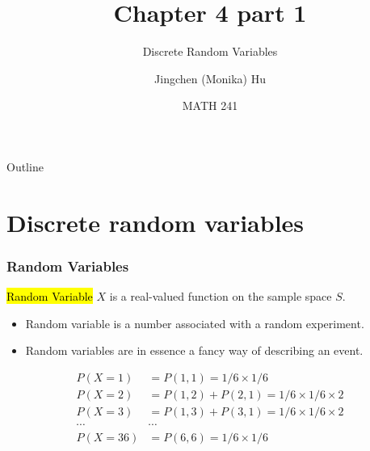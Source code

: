 \documentclass[slidestop,compress,mathserif]{beamer}
\title[Chapter 4 part 1]{Chapter 4 part 1}
\subtitle{Discrete Random Variables}
\author[Jingchen (Monika) Hu] %
{Jingchen (Monika) Hu}
\institute[Vassar] %
{Vassar College}
\date[MATH 241] %
{MATH 241}
\begin{document}


\begin{frame}%
\titlepage
\end{frame}

%
%
%
%
%
%


\begin{frame}{Outline}
\tableofcontents[hideallsubsections]
\end{frame}



\section{Discrete random variables}
\begin{frame}
\frametitle{Random Variables}

\begin{defn}
\hl{Random Variable} $X$ is a real-valued  function on the sample space $S$.
\end{defn}


\begin{itemize}
\item Random variable is a number associated with a random experiment.
\item Random variables are in essence a fancy way of describing an event.

\end{itemize}
\end{frame}



\begin{frame}


\pause
\begin{align*}
P(X = 1) & = P(1,  1) = 1 / 6 \times 1 / 6\\
P(X = 2) & = P(1,  2) + P(2, 1) = 1 / 6 \times 1 / 6 \times 2\\
P(X = 3) & = P(1,  3) + P(3, 1) = 1 / 6 \times 1 / 6 \times 2\\
 \cdots & \cdots \\
P(X = 36) & = P(6,  6) = 1 / 6 \times 1 / 6
\end{align*}

\end{frame}
\end{document}

